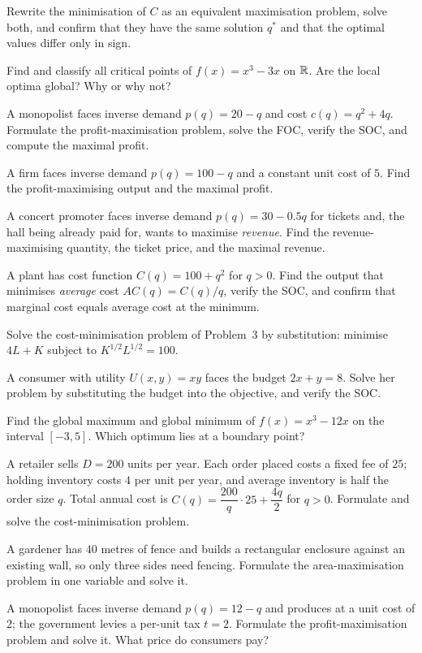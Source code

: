 \begin{problems}
        Rewrite the minimisation of $C$ as an equivalent maximisation
        problem, solve both, and confirm that they have the same
        solution $q^{*}$ and that the optimal values differ only in
        sign.
  \item Find and classify all critical points of $f(x)=x^{3}-3x$ on
        $\mathbb{R}$. Are the local optima global? Why or why not?
  \item A monopolist faces inverse demand $p(q)=20-q$ and cost
        $c(q)=q^{2}+4q$. Formulate the profit-maximisation problem,
        solve the FOC, verify the SOC, and compute the maximal profit.
  \item A firm faces inverse demand $p(q)=100-q$ and a constant unit
        cost of $5$. Find the profit-maximising output and the maximal
        profit.
  \item A concert promoter faces inverse demand $p(q)=30-0.5q$ for
        tickets and, the hall being already paid for, wants to maximise
        \emph{revenue}. Find the revenue-maximising quantity, the
        ticket price, and the maximal revenue.
  \item A plant has cost function $C(q)=100+q^{2}$ for $q>0$. Find the
        output that minimises \emph{average} cost $AC(q)=C(q)/q$,
        verify the SOC, and confirm that marginal cost equals average
        cost at the minimum.
  \item Solve the cost-minimisation problem of Problem~3 by
        substitution: minimise $4L+K$ subject to $K^{1/2}L^{1/2}=100$.
  \item A consumer with utility $U(x,y)=xy$ faces the budget
        $2x+y=8$. Solve her problem by substituting the budget into the
        objective, and verify the SOC.
  \item Find the global maximum and global minimum of
        $f(x)=x^{3}-12x$ on the interval $[-3,5]$. Which optimum lies
        at a boundary point?
  \item A retailer sells $D=200$ units per year. Each order placed
        costs a fixed fee of $25$; holding inventory costs $4$ per unit
        per year, and average inventory is half the order size $q$.
        Total annual cost is $C(q)=\dfrac{200}{q}\cdot 25+\dfrac{4q}{2}$
        for $q>0$. Formulate and solve the cost-minimisation problem.
  \item A gardener has $40$ metres of fence and builds a rectangular
        enclosure against an existing wall, so only three sides need
        fencing. Formulate the area-maximisation problem in one
        variable and solve it.
  \item A monopolist faces inverse demand $p(q)=12-q$ and produces at a
        unit cost of $2$; the government levies a per-unit tax $t=2$.
        Formulate the profit-maximisation problem and solve it. What
        price do consumers pay?
\end{problems}

